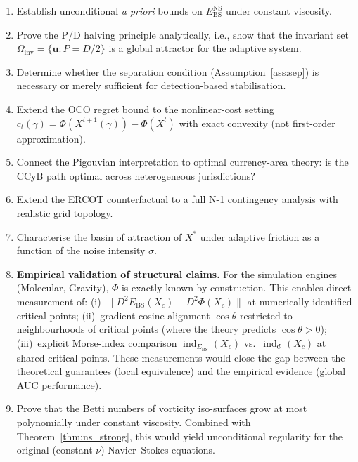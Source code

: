 \documentclass[final]{siamltex}
\newcommand{\Ebs}{E_{\mathrm{BS}}}
\newcommand{\Xst}{X^*}
\newcommand{\costheta}{\cos\theta}
\DeclareMathOperator{\ind}{ind}
\begin{document}
\begin{enumerate}
\item Establish unconditional \emph{a priori} bounds on
  $\Ebs^{\mathrm{NS}}$ under constant viscosity.

\item Prove the P/D halving principle analytically, i.e.,
  show that the invariant set $\Omega_{\mathrm{inv}} =
  \{\bm{u} : P = D/2\}$ is a global attractor for
  the adaptive system.

\item Determine whether the separation condition
  (Assumption~\ref{ass:sep}) is necessary or merely sufficient for
  detection-based stabilisation.

\item Extend the OCO regret bound to the nonlinear-cost setting
  $c_t(\gamma)=\Phi(X^{t+1}(\gamma))-\Phi(X^t)$ with exact
  convexity (not first-order approximation).

\item Connect the Pigouvian interpretation to optimal currency-area
  theory: is the CCyB path optimal across heterogeneous
  jurisdictions?

\item Extend the ERCOT counterfactual to a full N-1 contingency
  analysis with realistic grid topology.

\item Characterise the basin of attraction of $\Xst$ under
  adaptive friction as a function of the noise intensity $\sigma$.

\item \textbf{Empirical validation of structural claims.}
  For the simulation engines (Molecular, Gravity), $\Phi$ is
  exactly known by construction.  This enables direct measurement
  of: (i)~$\|D^2\Ebs(X_c) - D^2\Phi(X_c)\|$ at numerically
  identified critical points; (ii)~gradient cosine alignment
  $\costheta$ restricted to neighbourhoods of critical points
  (where the theory predicts $\costheta > 0$); (iii)~explicit
  Morse-index comparison $\ind_{\Ebs}(X_c)$ vs.\
  $\ind_\Phi(X_c)$ at shared critical points.  These
  measurements would close the gap between the
  theoretical guarantees (local equivalence) and the empirical
  evidence (global AUC performance).

\item Prove that the Betti numbers of vorticity iso-surfaces grow
  at most polynomially under constant viscosity.  Combined with
  Theorem~\ref{thm:ns_strong}, this would yield unconditional
  regularity for the original (constant-$\nu$) Navier--Stokes
  equations.


\end{enumerate}
\end{document}
